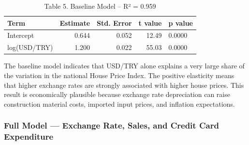 \documentclass[
  11pt,
  a4paper,
]{article}
\begin{document}
\begin{longtable}[t]{lrrrl}
\caption{\label{tab:model1}Table 5. Baseline Model – R² = 0.959}\\
\toprule
Term & Estimate & Std. Error & t value & p value\\
\midrule
Intercept & 0.644 & 0.052 & 12.49 & 0.0000\\
log(USD/TRY) & 1.200 & 0.022 & 55.03 & 0.0000\\
\bottomrule
\end{longtable}

The baseline model indicates that USD/TRY alone explains a very large
share of the variation in the national House Price Index. The positive
elasticity means that higher exchange rates are strongly associated with
higher house prices. This result is economically plausible because
exchange rate depreciation can raise construction material costs,
imported input prices, and inflation expectations.

\subsubsection{Full Model --- Exchange Rate, Sales, and Credit Card
Expenditure}\label{full-model-exchange-rate-sales-and-credit-card-expenditure}
\end{document}
